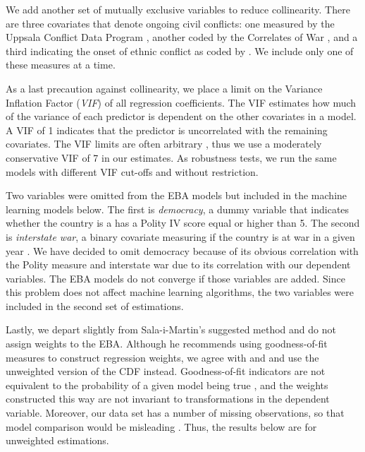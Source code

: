 We add another set of mutually exclusive variables to reduce collinearity. There are three covariates that denote ongoing civil conflicts: one measured by the Uppsala Conflict Data Program \citep{allansson2017organized,gleditsch2002armed}, another coded by the Correlates of War \citep{sarkees2010resort}, and a third indicating the onset of ethnic conflict as coded by \citet{cederman2010ethnic}. We include only one of these measures at a time. 
 
As a last precaution against collinearity, we place a limit on the Variance Inflation Factor (\textit{VIF}) of all regression coefficients. The VIF estimates how much of the variance of each predictor is dependent on the other covariates in a model. A VIF of 1 indicates that the predictor is uncorrelated with the remaining covariates. The VIF limits are often arbitrary \citep{bell2015examining,o2007caution}, thus we use a moderately conservative VIF of 7 in our estimates. As robustness tests, we run the same models with different VIF cut-offs and without restriction.

Two variables were omitted from the EBA models but included in the machine learning models below. The first is \textit{democracy}, a dummy variable that indicates whether the country is a has a Polity IV score equal or higher than 5. The second is \textit{interstate war}, a binary covariate measuring if the country is at war in a given year \citep{sarkees2010resort}. We have decided to omit democracy because of its obvious correlation with the Polity measure and interstate war due to its correlation with our dependent variables. The EBA models do not converge if those variables are added. Since this problem does not affect machine learning algorithms, the two variables were included in the second set of estimations.

Lastly, we depart slightly from Sala-i-Martin's suggested method and do not assign weights to the EBA. Although he recommends using goodness-of-fit measures to construct regression weights, we agree with \citet{sturm2002robust} and \citet[299]{gassebner2016expect} and use the unweighted version of the CDF instead. Goodness-of-fit indicators are not equivalent to the probability of a given model being true \citep{achen1977measuring,anscombe1973graphs,king1986not}, and the weights constructed this way are not invariant to transformations in the dependent variable. Moreover, our data set has a number of missing observations, so that model comparison would be misleading \citep{lall2016multiple}. Thus, the results below are for unweighted estimations. 

